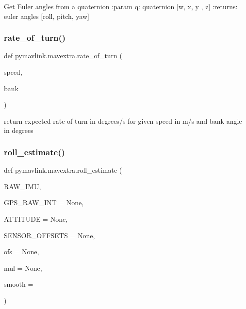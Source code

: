 \begin{DoxyVerb}Get Euler angles from a quaternion
:param q: quaternion [w, x, y , z]
:returns: euler angles [roll, pitch, yaw]
\end{DoxyVerb}
 \mbox{\label{namespacepymavlink_1_1mavextra_a4d7617fb1541d638db0023fd663c59fd}} 
\subsubsection{\texorpdfstring{rate\+\_\+of\+\_\+turn()}{rate\_of\_turn()}}
{\footnotesize\ttfamily def pymavlink.\+mavextra.\+rate\+\_\+of\+\_\+turn (\begin{DoxyParamCaption}\item[{}]{speed,  }\item[{}]{bank }\end{DoxyParamCaption})}

\begin{DoxyVerb}return expected rate of turn in degrees/s for given speed in m/s and
   bank angle in degrees\end{DoxyVerb}
 \mbox{\label{namespacepymavlink_1_1mavextra_a1a001cccb29771aea954d733377c92f9}} 
\subsubsection{\texorpdfstring{roll\+\_\+estimate()}{roll\_estimate()}}
{\footnotesize\ttfamily def pymavlink.\+mavextra.\+roll\+\_\+estimate (\begin{DoxyParamCaption}\item[{}]{R\+A\+W\+\_\+\+I\+MU,  }\item[{}]{G\+P\+S\+\_\+\+R\+A\+W\+\_\+\+I\+NT = {\ttfamily None},  }\item[{}]{A\+T\+T\+I\+T\+U\+DE = {\ttfamily None},  }\item[{}]{S\+E\+N\+S\+O\+R\+\_\+\+O\+F\+F\+S\+E\+TS = {\ttfamily None},  }\item[{}]{ofs = {\ttfamily None},  }\item[{}]{mul = {\ttfamily None},  }\item[{}]{smooth = {} }\end{DoxyParamCaption})}

